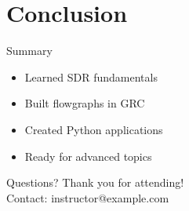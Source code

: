 \documentclass[aspectratio=169,11pt]{beamer}
\begin{document}
\section{Conclusion}
\begin{frame}{Summary}
\begin{itemize}
    \item Learned SDR fundamentals
    \item Built flowgraphs in GRC
    \item Created Python applications
    \item Ready for advanced topics
\end{itemize}
\end{frame}

\begin{frame}{Questions?}
\centering
\Large Thank you for attending!\\[1em]
\normalsize
Contact: instructor@example.com
\end{frame}
\end{document}
